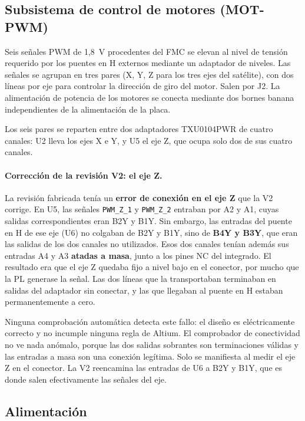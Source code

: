 \subsection{Subsistema de control de motores (MOT-PWM)}

Seis señales PWM de 1,8~V procedentes del FMC se elevan al nivel de tensión requerido por
los puentes en H externos mediante un adaptador de niveles. Las señales se agrupan en tres
pares (X, Y, Z para los tres ejes del satélite), con dos líneas por eje para controlar la
dirección de giro del motor. Salen por J2. La alimentación de potencia de los motores se
conecta mediante dos bornes banana independientes de la alimentación de la placa.

Los seis pares se reparten entre dos adaptadores TXU0104PWR de cuatro canales: U2 lleva los
ejes X e Y, y U5 el eje Z, que ocupa solo dos de sus cuatro canales.

\paragraph{Corrección de la revisión V2: el eje Z.}
La revisión fabricada tenía un \textbf{error de conexión en el eje Z} que la V2 corrige. En
U5, las señales \texttt{PWM\_Z\_1} y \texttt{PWM\_Z\_2} entraban por A2 y A1, cuyas salidas
correspondientes eran B2Y y B1Y. Sin embargo, las entradas del puente en H de ese eje (U6) no
colgaban de B2Y y B1Y, sino de \textbf{B4Y y B3Y}, que eran las salidas de los dos canales no
utilizados. Esos dos canales tenían además sus entradas A4 y A3 \textbf{atadas a masa}, junto a
los pines NC del integrado. El resultado era que el eje Z quedaba fijo a nivel bajo en el
conector, por mucho que la PL generase la señal. Las dos líneas que la transportaban terminaban
en salidas del adaptador sin conectar, y las que llegaban al puente en H estaban permanentemente
a cero.

Ninguna comprobación automática detecta este fallo: el diseño es eléctricamente correcto y no
incumple ninguna regla de Altium. El comprobador de conectividad no ve nada anómalo, porque las
dos salidas sobrantes son terminaciones válidas y las entradas a masa son una conexión legítima.
Solo se manifiesta al medir el eje Z en el conector. La V2 reencamina las entradas de U6 a B2Y y
B1Y, que es donde salen efectivamente las señales del eje.

\subsection{Alimentación}

